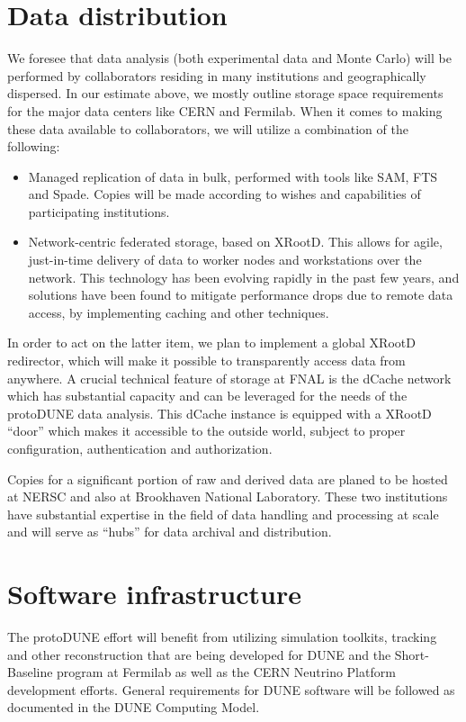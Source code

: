 \documentclass[12pt]{article}
\begin{document}
\section{Data distribution}
We foresee that data analysis (both experimental data and Monte Carlo) will be performed by collaborators residing in many 
institutions and geographically dispersed. In our
estimate above, we mostly outline storage space requirements for the
major data centers like CERN and Fermilab. When it comes to making these data available to collaborators, we will utilize a combination of the following:
\begin{itemize}
\item Managed replication of data in bulk, performed with tools like SAM, FTS and Spade. Copies will be made according to wishes and capabilities of participating institutions.
\item Network-centric federated storage, based on XRootD. This allows for agile, just-in-time delivery of data to worker nodes and workstations over the network. This
technology has been evolving rapidly in the past few years, and solutions have been found to mitigate performance drops due to remote data access, by implementing caching and other techniques.
\end{itemize}

\noindent In order to act on the latter item, we plan to implement a global XRootD redirector, which will make it possible to transparently access data from anywhere.
A crucial technical feature of storage at FNAL is the dCache network which has substantial capacity and can be leveraged
for the needs of the protoDUNE data analysis. This dCache instance is equipped with a XRootD ``door'' which makes it accessible to the outside world, subject
to proper configuration, authentication and authorization.


Copies for a significant portion of raw and derived data are planed to be hosted at NERSC and also at Brookhaven National Laboratory.
These two institutions have substantial expertise  in the field of data handling and processing at scale and will serve as ``hubs'' for data archival and distribution.


\section{Software infrastructure}

The protoDUNE effort will benefit from utilizing simulation toolkits, tracking and other reconstruction
that are being developed for DUNE and the Short-Baseline program at Fermilab as well as the 
CERN Neutrino Platform development efforts. General requirements for DUNE software will be followed
as documented in the DUNE Computing Model.
\end{document}

